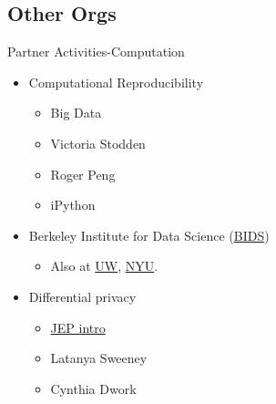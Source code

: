 \documentclass{beamer}
\begin{document}
\subsection{Other Orgs}
\begin{frame}{Partner Activities-Computation}
\begin{itemize}
\item Computational Reproducibility
	\begin{itemize}
	\item Big Data
	\item Victoria Stodden
	\item Roger Peng
	\item iPython
	\end{itemize}
\item Berkeley Institute for Data Science (\href{http://bids.berkeley.edu}{BIDS})
	\begin{itemize}
	\item Also at \href{http://escience.washington.edu/}{UW}, \href{http://cds.nyu.edu/mooresloan/}{NYU}.
	\end{itemize}
\item Differential privacy
	\begin{itemize}
	\item \href{https://www.aeaweb.org/articles.php?doi=10.1257/jep.28.2.75}{JEP intro}
	\item Latanya Sweeney
	\item Cynthia Dwork
	\end{itemize}
\end{itemize}

\end{frame}
\end{document}
